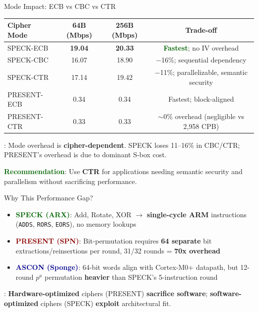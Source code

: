 \documentclass[aspectratio=169]{beamer}
\begin{document}
\begin{frame}{Mode Impact: ECB vs CBC vs CTR}
\vspace{-0.3cm}
\begin{table}
    \centering
    \small
    \begin{tabular}{lccc}
        \toprule
        \textbf{Cipher Mode} & \textbf{64B (Mbps)} & \textbf{256B (Mbps)} & \textbf{Trade-off} \\
        \midrule
        SPECK-ECB & \textbf{19.04} & \textbf{20.33} & \textbf{\textcolor{darkgreen}{Fastest}}; no IV overhead \\
        SPECK-CBC & 16.07 & 18.90 & $-$16\%; sequential dependency \\
        SPECK-CTR & 17.14 & 19.42 & $-$11\%; \alert{parallelizable, semantic security} \\
        \midrule
        PRESENT-ECB & 0.34 & 0.34 & Fastest; block-aligned \\
        PRESENT-CTR & 0.33 & 0.33 & $\sim$0\% overhead (negligible vs 2,958 CPB) \\
        \bottomrule
    \end{tabular}
\end{table}

\vspace{0.2cm}
\textbf{}: Mode overhead is \textbf{\alert{cipher-dependent}}. SPECK loses 11–16\% in CBC/CTR; PRESENT's overhead is \textbf{} due to dominant S-box cost.

\vspace{0.1cm}
\textbf{\textcolor{darkgreen}{Recommendation}}: Use \textbf{CTR} for applications needing semantic security and parallelism without sacrificing performance.
\end{frame}

\begin{frame}{Why This Performance Gap?}
\textbf{}
\begin{itemize}
    \item \textbf{\textcolor{darkgreen}{SPECK (ARX)}}: Add, Rotate, XOR $\rightarrow$ \alert{\textbf{single-cycle ARM}} instructions (\texttt{ADDS}, \texttt{RORS}, \texttt{EORS}), no memory lookups
    \item \textbf{\textcolor{darkred}{PRESENT (SPN)}}: Bit-permutation requires \alert{\textbf{64 separate}} bit extractions/reinsertions per round, 31/32 rounds = \textbf{70x overhead}
    \item \textbf{\textcolor{darkblue}{ASCON (Sponge)}}: 64-bit words align with Cortex-M0+ datapath, but 12-round $p^a$ permutation \textbf{heavier} than SPECK's 5-instruction round
\end{itemize}

\vspace{0.2cm}
\textbf{}: \alert{\textbf{Hardware-optimized}} ciphers (PRESENT) \textbf{sacrifice software}; \textbf{software-optimized} ciphers (SPECK) \textbf{exploit} architectural fit.
\end{frame}
\end{document}
